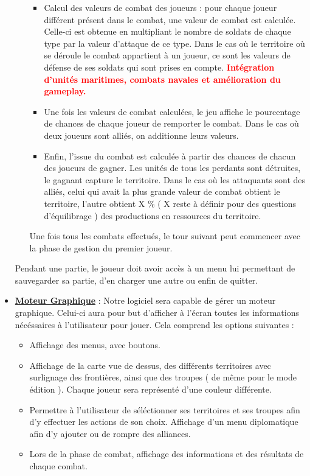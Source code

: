 \begin{itemize}
\begin{itemize}
	  \begin{itemize}
	    \item Calcul des valeurs de combat des joueurs : pour chaque joueur différent présent dans le combat, une valeur de combat est calculée. Celle-ci est obtenue en multipliant le nombre de soldats de chaque type par la valeur d'attaque de ce type. Dans le cas où le territoire où se déroule le combat appartient à un joueur, ce sont les valeurs de défense de ses soldats qui sont prises en compte.
	      \textcolor{red}{\textbf{Intégration d'unités maritimes, combats navales et amélioration du gameplay.}}
	    \item Une fois les valeurs de combat calculées, le jeu affiche le pourcentage de chances de chaque joueur de remporter le combat.
	      Dans le cas où deux joueurs sont alliés, on additionne leurs valeurs.
	    \item Enfin, l'issue du combat est calculée à partir des chances de chacun des joueurs de gagner. Les unités de tous les perdants sont détruites, le gagnant capture le territoire. Dans le cas où les attaquants sont des alliés, celui qui avait la plus grande valeur de combat obtient le territoire, l'autre obtient X  \% ( X reste à définir pour des questions d'équilibrage ) des productions en ressources du territoire.
	  \end{itemize}
	  Une fois tous les combats effectués, le tour suivant peut commencer avec la phase de gestion du premier joueur.
	  
      \end{itemize}
      Pendant une partie, le joueur doit avoir accès à un menu lui permettant de sauvegarder sa partie, d'en charger une autre ou enfin de quitter.
    \vspace{1cm}
    \item \textbf{\underline{Moteur Graphique}} : Notre logiciel sera capable de gérer un moteur graphique. Celui-ci aura pour but d'afficher à l'écran toutes les informations nécéssaires à l'utilisateur pour jouer. Cela comprend les options suivantes :
      \begin{itemize}
	\item Affichage des menus, avec boutons.
	\item Affichage de la carte vue de dessus, des différents territoires avec surlignage des frontières, ainsi que des troupes ( de même pour le mode édition ).
	  Chaque joueur sera représenté d'une couleur différente.
	\item Permettre à l'utilisateur de séléctionner ses territoires et ses troupes afin d'y effectuer les actions de son choix. Affichage d'un menu diplomatique 
	  afin d'y ajouter ou de rompre des alliances.
	\item Lors de la phase de combat, affichage des informations et des résultats de chaque combat.


\end{itemize}
\end{itemize}
